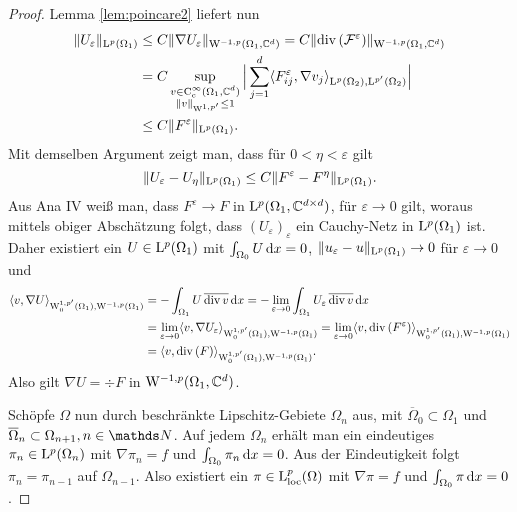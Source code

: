 \begin{proof}
  Lemma \ref{lem:poincare2} liefert nun
  \begin{align*}
  \| U_\varepsilon\|_{\mathrm{L}^p(\Omega_1)} 
  &\leq C \|\nabla U_\varepsilon\|_{\mathrm{W}^{-1,p}(\Omega_1, \mathbb{C}^d)} 
    = C \| \mathrm{div\,} (\mathcal{F}^\varepsilon)\|_{\mathrm{W}^{-1,p}(\Omega_1,\mathbb{C}^d)} \\
    &= C \sup_{\substack{v \in \mathrm{C}_{\mathrm{c}}^\infty(\Omega_1, \mathbb{C}^d) \\ \|v\|_{\mathrm{W}^{1,p'}} \leq 1}} \Big| \sum_{j = 1}^d \langle F_{ij}^\varepsilon, \nabla v_j \rangle_{\mathrm{L}^p(\Omega_2), \mathrm{L}^{p'}(\Omega_2)} \Big| \\
    &\leq C \|F^\varepsilon\|_{\mathrm{L}^p(\Omega_1)}.
  \end{align*}
  Mit demselben Argument zeigt man, dass für $0< \eta < \varepsilon$ gilt
  $$
  \|U_\varepsilon - U_\eta \|_{\mathrm{L}^p(\Omega_1)} \leq C \| F^\varepsilon - F^\eta\|_{\mathrm{L}^p(\Omega_1)}.
  $$
  Aus Ana IV weiß man, dass $F^\varepsilon \to F$ in $\mathrm{L}^p(\Omega_1, \mathbb{C}^{d\times d})$, für $\varepsilon \to 0$ gilt, woraus mittels obiger Abschätzung folgt, dass $(U_\varepsilon)_\varepsilon$ ein Cauchy-Netz in $\mathrm{L}^p(\Omega_1)$ ist.
  Daher existiert ein $U \in \mathrm{L}^p(\Omega_1)$ mit $\int_{\Omega_0} U \, {\operatorname{d}\!{x}} = 0$, $\|u_\varepsilon - u\|_{\mathrm{L}^p(\Omega_1)} \to 0$ für $\varepsilon \to 0$ und
  \begin{align*}
    \langle v, \nabla U \rangle_{\mathrm{W}_0^{1,p'}(\Omega_1), \mathrm{W}^{-1,p}(\Omega_1)}
    &= - \int_{\Omega_1} U \, \overline{\mathrm{div\,} v } \, {\operatorname{d}\!{x}}
    = - \lim_{\varepsilon \to 0} \int_{\Omega_1} U_\varepsilon \, \overline{\mathrm{div\,} v} \, {\operatorname{d}\!{x}} \\
    &= \lim_{\varepsilon \to 0} \langle v, \nabla U_\varepsilon \rangle_{\mathrm{W}_0^{1,p'}(\Omega_1), \mathrm{W}^{-1, p}(\Omega_1)}
    = \lim_{\varepsilon \to 0} \langle v, \mathrm{div\,} (F^\varepsilon) \rangle_{\mathrm{W}_0^{1,p'}(\Omega_1), \mathrm{W}^{-1, p}(\Omega_1)} \\
     &= \langle v, \mathrm{div\,} (F) \rangle_{\mathrm{W}_0^{1,p'}(\Omega_1), \mathrm{W}^{-1, p}(\Omega_1)}.
  \end{align*}
  Also gilt $\nabla U = \div F$ in $\mathrm{W}^{-1,p}(\Omega_1, \mathbb{C}^d)$.
  
  Schöpfe $\Omega$ nun durch beschränkte Lipschitz-Gebiete $\Omega_n$ aus, mit $\overline\Omega_0 \subset \Omega_1$ und $\overline\Omega_n \subset \Omega_{n + 1}, n \in \N$.
  Auf jedem $\Omega_n$ erhält man ein eindeutiges $\pi_n \in \mathrm{L}^p(\Omega_n)$ mit $\nabla \pi_n = f$ und $\int_{\Omega_0} \pi_n \, {\operatorname{d}\!{x}} = 0$.
  Aus der Eindeutigkeit folgt $\pi_n = \pi_{n -1}$ auf $\Omega_{n - 1}$.
  Also existiert ein $\pi \in \mathrm{L}^p_{\operatorname{loc}}(\Omega)$ mit $\nabla\pi = f$ und $\int_{\Omega_0} \pi \, {\operatorname{d}\!{x}} = 0$.
\end{proof}

